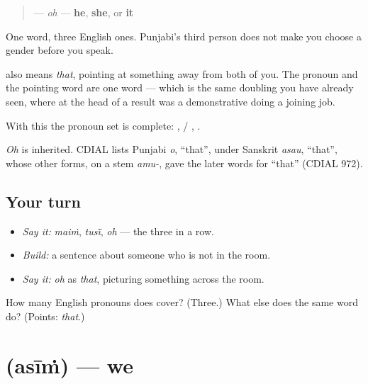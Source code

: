 \begin{cousinweb}
\begin{quote}
\textbf{} — \emph{oh} — \textbf{he}, \textbf{she}, or \textbf{it}
\end{quote}

One word, three English ones. Punjabi's third person does not make you choose a gender before you speak.

\textbf{} also means \emph{that}, pointing at something away from both of you. The pronoun and the pointing word are one word — which is the same doubling you have already seen, where \textbf{} at the head of a result was a demonstrative doing a joining job.

With this the pronoun set is complete: \textbf{}, \textbf{} / \textbf{}, \textbf{}.

\emph{Oh} is inherited. CDIAL lists Punjabi \emph{o}, \textquotedblleft{}that\textquotedblright{}, under Sanskrit \emph{asau}, \textquotedblleft{}that\textquotedblright{}, whose other forms, on a stem \emph{amu-}, gave the later words for \textquotedblleft{}that\textquotedblright{} (CDIAL 972).
\end{cousinweb}

\subsection*{Your turn}
\begin{itemize}
\raggedright
  \item \emph{Say it:} \emph{maiṁ}, \emph{tusī̃}, \emph{oh} — the three in a row.
  \item \emph{Build:} a sentence about someone who is not in the room.
  \item \emph{Say it:} \emph{oh} as \emph{that}, picturing something across the room.
\end{itemize}

\begin{tcolorbox}[breakable,colback=teal!4,colframe=teal!35!black,title={Before you move on}]
How many English pronouns does \textbf{} cover? (Three.) What else does the same word do? (Points: \emph{that}.)
\end{tcolorbox}
\section[\texorpdfstring{\pa{ਅਸੀਂ} (asīṁ)}{ਅਸੀਂ (asīṁ)}]{ (asīṁ) — we}

\label{lesson:PA-C42-asi}



